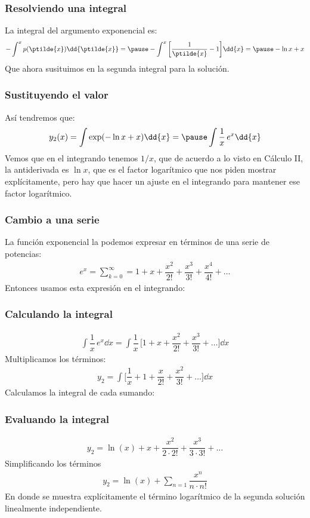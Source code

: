 \begin{frame}
\frametitle{Resolviendo una integral}
La integral del argumento exponencial es:
\begin{eqnarray*}
- \int^{x} p(\ptilde{x}) \dd{\ptilde{x}} = \pause - \int^{x} \bigg[ \dfrac{1}{\ptilde{x}} - 1 \bigg] \dd{x}= \pause - \ln x + x
\end{eqnarray*}
\pause
Que ahora susituimos en la segunda integral para la solución.
\end{frame}
\begin{frame}
\frametitle{Sustituyendo el valor}
Así tendremos que:
\begin{eqnarray*}
y_{2} (x) = \int \exp(- \ln x + x ) \dd{x} = \pause \int \dfrac{1}{x} \, e^{x} \dd{x}
\end{eqnarray*}
\pause
Vemos que en el integrando tenemos $1/x$, que de acuerdo a lo visto en Cálculo II, la antiderivada es $\ln x$, que es el factor logarítmico que nos piden mostrar explícitamente, pero hay que hacer un ajuste en el integrando para mantener ese factor logarítmico.
\end{frame}
\begin{frame}
\frametitle{Cambio a una serie}
La función exponencial la podemos expresar en términos de una serie de potencias:
\begin{align*}
e^{x} = \sum_{k=0}^{\infty} =  1 + x + \dfrac{x^{2}}{2!} + \dfrac{x^{3}}{3!} + \dfrac{x^{4}}{4!} + \ldots
\end{align*}
\pause
Entonces usamos esta expresión en el integrando:
\end{frame}
\begin{frame}
\frametitle{Calculando la integral}
\begin{align*}
\int \dfrac{1}{x} \, e^{x} \dd{x} = \int \dfrac{1}{x} \, \bigg[ 1 + x + \dfrac{x^{2}}{2!} + \dfrac{x^{3}}{3!} + \ldots \bigg] \dd{x}
\end{align*}
\pause
Multiplicamos los términos:
\begin{align*}
y_{2} = \int \bigg[ \dfrac{1}{x} + 1 + \dfrac{x}{2!} + \dfrac{x^{2}}{3!} + \ldots \bigg] \dd{x}
\end{align*}
Calculamos la integral de cada sumando:
\end{frame}
\begin{frame}
\frametitle{Evaluando la integral}
\begin{align*}
y_{2} =  \ln (x) + x + \dfrac{x^{2}}{2 \cdot 2!} + \dfrac{x^{3}}{3 \cdot 3!} + \ldots
\end{align*}
\pause
Simplificando los términos
\begin{align*}
y_{2} =  \ln (x) + \sum_{n=1} \dfrac{x^{n}}{n \cdot n!}
\end{align*}
En donde se muestra explícitamente el término logarítmico de la segunda solución linealmente independiente.
\end{frame}
